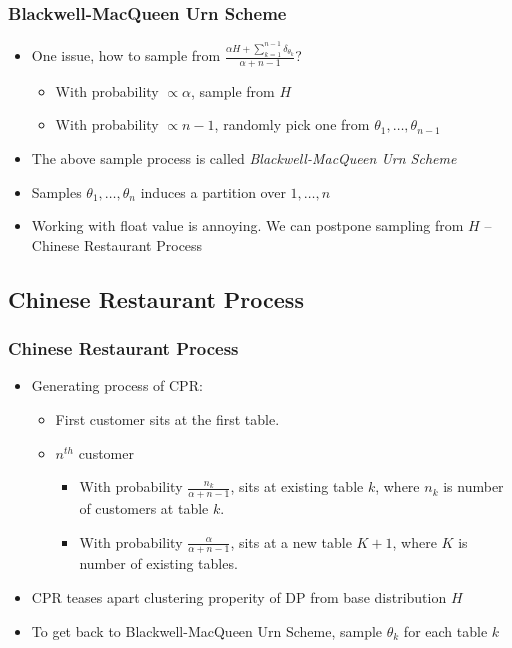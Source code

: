 \documentclass{beamer}
\begin{document}
\begin{frame}
	\frametitle{Blackwell-MacQueen Urn Scheme}
	\begin{itemize}
		\item One issue, how to sample from $\frac{\alpha H + \sum_{k=1}^{n-1}\delta_{\theta_k}}{\alpha+n-1}$?
		\begin{itemize}
			\item With probability $\propto \alpha$, sample from $H$
			\item With probability $\propto n-1$, randomly pick one from $\theta_1,\ldots,
			 \theta_{n-1}$
		\end{itemize}
		\item The above sample process is called {\em Blackwell-MacQueen Urn Scheme}
		\item Samples $\theta_1, \ldots, \theta_n$ induces a partition over $1,\ldots,n$
		\item Working with float value is annoying. We can postpone sampling from $H$ -- Chinese Restaurant Process
	\end{itemize}
\end{frame}

\subsection{Chinese Restaurant Process}
\begin{frame}
\frametitle{Chinese Restaurant Process}
	\begin{itemize}
		\item Generating process of CPR:
		\begin{itemize}
			\item First customer sits at the first table.
			\item $n^{th}$ customer
				\begin{itemize}
					\item With probability $\frac{n_k}{\alpha+n-1}$, sits at existing table $k$, where $n_k$ is number of customers at table $k$.
					\item With probability $\frac{\alpha}{\alpha+n-1}$, sits at a new table $K+1$, where $K$ is number of existing tables.
				\end{itemize}
		\end{itemize}
		
		\item CPR teases apart clustering properity of DP from base distribution $H$
		\item To get back to Blackwell-MacQueen Urn Scheme, sample $\theta_k$ for each table $k$
	\end{itemize}
\end{frame}
\end{document}
